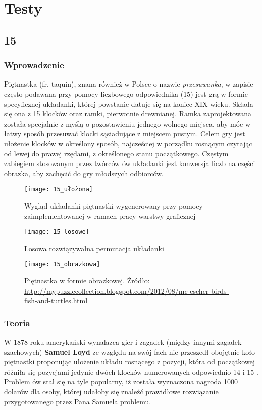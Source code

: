 \chapter{Testy}
\thispagestyle{chapterBeginStyle}

\section{15}
\label{15Test}
    \subsection{Wprowadzenie}
        Piętnastka (fr. taquin), znana również w Polsce o nazwie \textit{przesuwanka}, w zapisie często podawana przy pomocy liczbowego
        odpowiednika (15) jest grą w formie specyficznej
        układanki, której powstanie datuje się na koniec XIX wieku. Składa się ona z 
        15 klocków oraz ramki, pierwotnie drewnianej. Ramka zaprojektowana została specjalnie z myślą
        o pozostawieniu jednego wolnego miejsca, aby móc w łatwy sposób przesuwać klocki sąsiadujące z miejscem 
        pustym. Celem gry jest ułożenie klocków w określony sposób, najcześciej w porządku rosnącym czytając 
        od lewej do prawej rzędami, z określonego stanu początkowego. Częstym zabiegiem stosowanym przez 
        twórców ów układanki jest konwersja liczb na części obrazka, aby zachęcić do gry młodszych odbiorców.

        \begin{figure}[H]
            \texttt{[image: 15\_ułożona]}
            \centering
            \caption{Wygląd układanki piętnastki wygenerowany przy pomocy zaimplementowanej w ramach pracy warstwy graficznej}
        \end{figure}

        \begin{figure}[H]
            \texttt{[image: 15\_losowe]}
            \centering
            \caption{Losowa rozwiązywalna permutacja układanki}
        \end{figure}

        \begin{figure}[H]
            \texttt{[image: 15\_obrazkowa]}
            \centering
            \caption{Piętnastka w formie obrazkowej. Źródło: \url{http://mypuzzlecollection.blogspot.com/2012/08/mc-escher-birds-fish-and-turtles.html}}
        \end{figure}

    \subsection{Teoria}
        W 1878 roku amerykański wynalazca gier i zagadek (między innymi zagadek szachowych) \textbf{Samuel Loyd} ze względu na swój fach 
        nie przeszedł obojętnie koło piętnastki proponując ułożenie układu rosnącego z pozycji, która 
        od początkowej różniła się pozycjami jedynie dwóch klocków numerowanych odpowiednio 14 i 15 \cite{FifteenLoydProblem}.
        Problem ów stał się na tyle popularny, iż została wyznaczona nagroda 1000 dolarów dla osoby, której udałoby się 
        znaleźć prawidłowe rozwiązanie przygotowanego przez Pana Samuela problemu.

